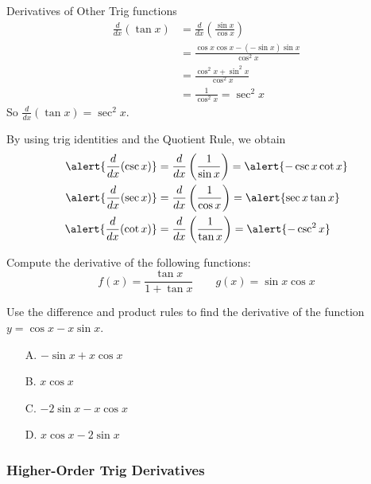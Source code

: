 \documentclass[cal1spr16Lectures.tex]{subfiles}
\begin{document}
\begin{frame}{\small Derivatives of Other Trig functions}\footnotesize
\begin{align*}
\frac{d}{dx}(\tan x)&=\frac{d}{dx} \left( \frac{\sin x}{\cos x}\right) \\
 &= \frac{\cos x \cos x - (-\sin x)\sin x }{\cos^2 x} \\
&= \frac{\cos^2 x + \sin^2 x}{\cos^2 x} \\
&= \frac{1}{\cos^2 x} = \sec^2 x
\end{align*}
So \alert{$\frac{d}{dx} (\tan x)=\sec^2 x$}.
\end{frame}

\begin{frame}{}
By using trig identities and the Quotient Rule, we obtain
\begin{align*}
\alert{\frac{d}{dx} (\csc x)} &= \frac{d}{dx} \left( \frac{1}{\sin x}\right) = \alert{-\csc x \cot x} \\
\alert{\frac{d}{dx} (\sec x)} &= \frac{d}{dx} \left( \frac{1}{\cos x}\right) = \alert{\sec x \tan x} \\
\alert{\frac{d}{dx} (\cot x)} &= \frac{d}{dx} \left( \frac{1}{\tan x}\right) = \alert{-\csc^2 x}  
\end{align*}
\end{frame}

\begin{frame}
\begin{exe} Compute the derivative of the following functions:
\[f(x)=\frac{\tan x}{1+\tan x} \qquad g(x)=\sin x \cos x\]
\end{exe}
\end{frame}

\begin{frame}
\begin{exe} 
Use the difference and product rules to find the derivative of the function $y=\cos x-x\sin x$.
\begin{itemize}
\item[A. ] $-\sin x+x\cos x$
\item[B. ] $x\cos x$
\item[C. ] $-2\sin x-x\cos x$
\item[D. ] $x\cos x-2\sin x$
\end{itemize}
\end{exe}
\end{frame}

\subsubsection{Higher-Order Trig Derivatives}
\end{document}
